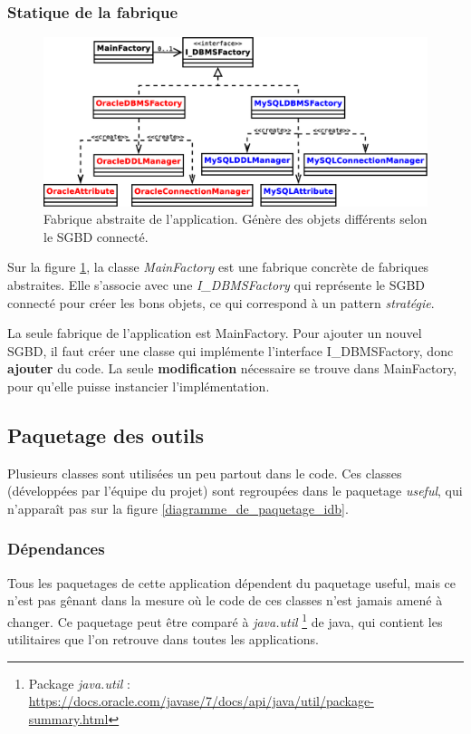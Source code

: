 \subsubsection{Statique de la fabrique}
\begin{figure}[!h]
  \centering
  \includegraphics[width=14cm]{images/diagramme_classes_fabriques.eps}
  \caption{Fabrique abstraite de l'application. Génère des objets différents selon le SGBD connecté.}
  \label{diagramme_classes_fabrique}
\end{figure}

Sur la figure \ref{diagramme_classes_fabrique}, la classe \textit{MainFactory} est une fabrique concrète de fabriques abstraites.
Elle s'associe avec une \textit{I\_DBMSFactory} qui représente le SGBD connecté pour créer les bons objets, ce qui correspond à un pattern \textit{stratégie}.

La seule fabrique de l'application est MainFactory.
Pour ajouter un nouvel SGBD, il faut créer une classe qui implémente l'interface I\_DBMSFactory, donc \textbf{ajouter} du code.
La seule \textbf{modification} nécessaire se trouve dans MainFactory, pour qu'elle puisse instancier l'implémentation.

\subsection{Paquetage des outils}
Plusieurs classes sont utilisées un peu partout dans le code.
Ces classes (développées par l'équipe du projet) sont regroupées dans le paquetage \textit{useful}, qui n'apparaît pas sur la figure \ref{diagramme_de_paquetage_idb}.

\subsubsection{Dépendances}
Tous les paquetages de cette application dépendent du paquetage useful, mais ce n'est pas gênant dans la mesure où le code de ces classes n'est jamais amené à changer.
Ce paquetage peut être comparé à \textit{java.util}
\footnote{\label{paguetage_java_util}Package \textit{java.util} : \url{https://docs.oracle.com/javase/7/docs/api/java/util/package-summary.html}}
de java, qui contient les utilitaires que l'on retrouve dans toutes les applications.

